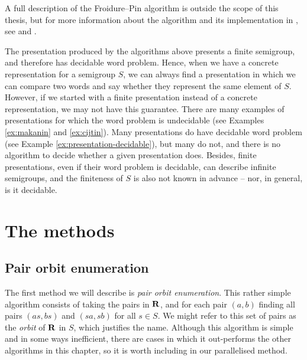 A full description of the Froidure--Pin algorithm is outside the scope of this
thesis, but for more information about the algorithm and its implementation in
\libsemigroups{}, see \cite{froidure_pin} and \cite{froidure_pin_jonusas}.

The presentation produced by the algorithms above presents a finite semigroup,
and therefore has decidable word problem.  Hence, when we have a concrete
representation for a semigroup $S$, we can always find a presentation in which
we can compare two words and say whether they represent the same element of $S$.
However, if we started with a finite presentation instead of a concrete
representation, we may not have this guarantee.  There are many examples of
presentations for which the word problem is undecidable (see Examples
\ref{ex:makanin} and \ref{ex:cijtin}). Many presentations do have decidable word
problem (see Example \ref{ex:presentation-decidable}), but many do not, and
there is no algorithm to decide whether a given presentation does.  Besides,
finite presentations, even if their word problem is decidable, can describe
infinite semigroups, and the finiteness of $S$ is also not known in advance --
nor, in general, is it decidable.

\section{The methods}
\label{sec:methods}

\subsection{Pair orbit enumeration}
\label{sec:p}

The first method we will describe is \textit{pair orbit enumeration}.  This
rather simple algorithm consists of taking the pairs in $\mathbf{R}$, and for each pair
$(a,b)$ finding all pairs $(as, bs)$ and $(sa, sb)$ for all $s \in S$.  We might
refer to this set of pairs as the \textit{orbit} of $\mathbf{R}$ in $S$, which justifies
the name.  Although this algorithm is simple and in some ways inefficient, there
are cases in which it out-performs the other algorithms in this chapter, so it
is worth including in our parallelised method.

